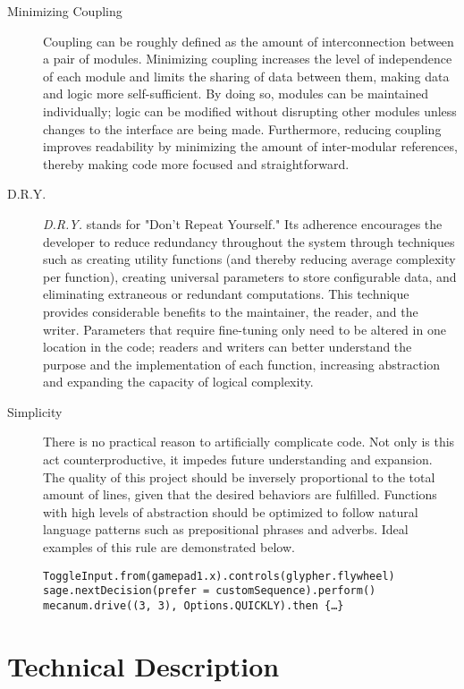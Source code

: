 \documentclass[letterpaper]{article}
\begin{document}
\begin{description}

\item[Minimizing Coupling]
Coupling can be roughly defined as the amount of interconnection between a pair of modules. Minimizing coupling increases the level of independence of each module and limits the sharing of data between them, making data and logic more self-sufficient. By doing so, modules can be maintained individually; logic can be modified without disrupting other modules unless changes to the interface are being made. Furthermore, reducing coupling improves readability by minimizing the amount of inter-modular references, thereby making code more focused and straightforward.

\item[D.R.Y.]
\textit{D.R.Y.} stands for "Don't Repeat Yourself." Its adherence encourages the developer to reduce redundancy throughout the system through techniques such as creating utility functions (and thereby reducing average complexity per function), creating universal parameters to store configurable data, and eliminating extraneous or redundant computations. This technique provides considerable benefits to the maintainer, the reader, and the writer. Parameters that require fine-tuning only need to be altered in one location in the code; readers and writers can better understand the purpose and the implementation of each function, increasing abstraction and expanding the capacity of logical complexity.

\item[Simplicity]
There is no practical reason to artificially complicate code. Not only is this act counterproductive, it impedes future understanding and expansion. The quality of this project should be inversely proportional to the total amount of lines, given that the desired behaviors are fulfilled. Functions with high levels of abstraction should be optimized to follow natural language patterns such as prepositional phrases and adverbs. Ideal examples of this rule are demonstrated below.
\begin{center}
	\texttt{ToggleInput.from(gamepad1.x).controls(glypher.flywheel)}
	\texttt{sage.nextDecision(prefer = customSequence).perform()}
	\texttt{mecanum.drive((3, 3), Options.QUICKLY).then \{\dots\}}
\end{center}

\end{description}

\section{Technical Description}
\end{document}
